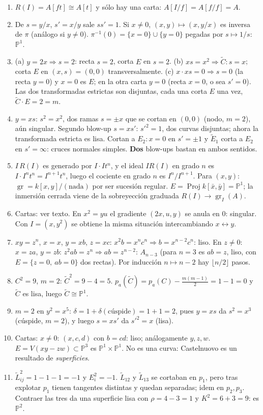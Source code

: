 \documentclass[11pt,a4paper]{article}
\newcommand{\Proj}{\operatorname{Proj}}
\newcommand{\gr}{\operatorname{gr}}
\newcommand{\PP}{\mathbb{P}}
\theoremstyle{plain}
\theoremstyle{definition}
\theoremstyle{remark}
\begin{document}
\begin{enumerate}[label=\textbf{Ej.~\arabic*.},leftmargin=*,itemsep=4pt]
\item $R(I)=A[ft]\cong A[t]$ y sólo hay una carta: $A[I/f]=A[f/f]=A$.
\item De $s=y/x$, $s'=x/y$ sale $ss'=1$. Si $x\ne0$, $(x,y)\mapsto(x,y/x)$ es inversa de $\pi$ (análogo si $y\ne0$). $\pi^{-1}(0)=\{x=0\}\cup\{y=0\}$ pegadas por $s\mapsto1/s$: $\PP^1$.
\item (a) $y=2x\Rightarrow s=2$: recta $s=2$, corta $E$ en $s=2$. (b) $xs=x^2\Rightarrow\tilde C\colon s=x$; corta $E$ en $(x,s)=(0,0)$ transversalmente. (c) $x\cdot xs=0\Rightarrow s=0$ (la recta $y=0$) y $x=0$ es $E$; en la otra carta $y=0$ (recta $x=0$, o sea $s'=0$). Las dos transformadas estrictas son disjuntas, cada una corta $E$ una vez, $\tilde C\cdot E=2=m$.
\item $y=xs$: $s^2=x^2$, dos ramas $s=\pm x$ que se cortan en $(0,0)$ (nodo, $m=2$), aún singular. Segundo blow-up $s=xs'$: $s'^2=1$, dos curvas disjuntas; ahora la transformada estricta es lisa. Cortan a $E_2\colon x=0$ en $s'=\pm1$ y $\tilde E_1$ corta a $E_2$ en $s'=\infty$: cruces normales simples. \textbf{Dos} blow-ups bastan en ambos sentidos.
\item $I\,R(I)$ es generado por $I\cdot It^n$, y el ideal $IR(I)$ en grado $n$ es $I\cdot I^nt^n=I^{n+1}t^n$, luego el cociente en grado $n$ es $I^n/I^{n+1}$. Para $(x,y)$: $\gr=k[x,y]/(\text{nada})$ por ser sucesión regular. $E=\Proj k[\bar x,\bar y]=\PP^1$; la inmersión cerrada viene de la sobreyección graduada $R(I)\to\gr_I(A)$.
\item Cartas: ver texto. En $x^2=yu$ el gradiente $(2x,u,y)$ se anula en $0$: singular. Con $I=(x,y^2)$ se obtiene la misma situación intercambiando $x\leftrightarrow y$.
\item $x y=z^n$, $x=x$, $y=xb$, $z=xc$: $x^2b=x^nc^n\Rightarrow b=x^{n-2}c^n$: liso. En $z\neq0$: $x=za$, $y=zb$: $z^2ab=z^n\Rightarrow ab=z^{n-2}$: $A_{n-3}$ (para $n=3$ es $ab=z$, liso, con $E=\{z=0,\ ab=0\}$ dos rectas). Por inducción $n\mapsto n-2$ hay $\lfloor n/2\rfloor$ pasos.
\item $C^2=9$, $m=2$: $\tilde C^2=9-4=5$. $p_a(\tilde C)=p_a(C)-\tfrac{m(m-1)}{2}=1-1=0$ y $\tilde C$ es lisa, luego $\tilde C\cong\PP^1$.
\item $m=2$ en $y^2=x^5$: $\delta=1+\delta(\text{cúspide})=1+1=2$, pues $y=xs$ da $s^2=x^3$ (cúspide, $m=2$), y luego $s=xs'$ da $s'^2=x$ (lisa).
\item Cartas: $x\ne0$: $(x,c,d)$ con $b=cd$: liso; análogamente $y,z,w$. $E=V(xy-zw)\subset\PP^3$ es $\PP^1\times\PP^1$. No es una curva: Castelnuovo es un resultado de \emph{superficies}.
\item $\tilde L_{ij}^2=1-1-1=-1$ y $E_i^2=-1$. $\tilde L_{12}$ y $\tilde L_{13}$ se cortaban en $p_1$, pero tras explotar $p_1$ tienen tangentes distintas y quedan separadas; idem en $p_2,p_3$. Contraer las tres da una superficie lisa con $\rho=4-3=1$ y $K^2=6+3=9$: es $\PP^2$.
\end{enumerate}
\end{document}
